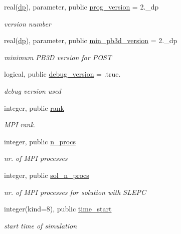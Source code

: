 \begin{DoxyCompactItemize}
real(\hyperlink{namespacenum__vars_a03802aa2bd86439d7a9370836fabf3f2}{dp}), parameter, public \hyperlink{namespacenum__vars_a7ab03bffd054a230cad4b7e2c130def1}{prog\+\_\+version} = 2.\+\_\+dp
\begin{DoxyCompactList}\small\item\em version number \end{DoxyCompactList}\item 
real(\hyperlink{namespacenum__vars_a03802aa2bd86439d7a9370836fabf3f2}{dp}), parameter, public \hyperlink{namespacenum__vars_a7188b02fe090f6e8891fdd26f604284f}{min\+\_\+pb3d\+\_\+version} = 2.\+\_\+dp
\begin{DoxyCompactList}\small\item\em minimum P\+B3D version for P\+O\+ST \end{DoxyCompactList}\item 
logical, public \hyperlink{namespacenum__vars_a60589d0e73cbffd69d115c1f709745a2}{debug\+\_\+version} = .true.
\begin{DoxyCompactList}\small\item\em debug version used \end{DoxyCompactList}\item 
integer, public \hyperlink{namespacenum__vars_ab47aa91445feaedb05ac9d1a584664fe}{rank}
\begin{DoxyCompactList}\small\item\em M\+PI rank. \end{DoxyCompactList}\item 
integer, public \hyperlink{namespacenum__vars_a3a1f41c66c3d91fc749bcffd177b0662}{n\+\_\+procs}
\begin{DoxyCompactList}\small\item\em nr. of M\+PI processes \end{DoxyCompactList}\item 
integer, public \hyperlink{namespacenum__vars_a03373a7c9a040867e8108023f2ccf479}{sol\+\_\+n\+\_\+procs}
\begin{DoxyCompactList}\small\item\em nr. of M\+PI processes for solution with S\+L\+E\+PC \end{DoxyCompactList}\item 
integer(kind=8), public \hyperlink{namespacenum__vars_a70922471370a77597325ce9ef7b897a2}{time\+\_\+start}
\begin{DoxyCompactList}\small\item\em start time of simulation \end{DoxyCompactList}\item 

\end{DoxyCompactItemize}
